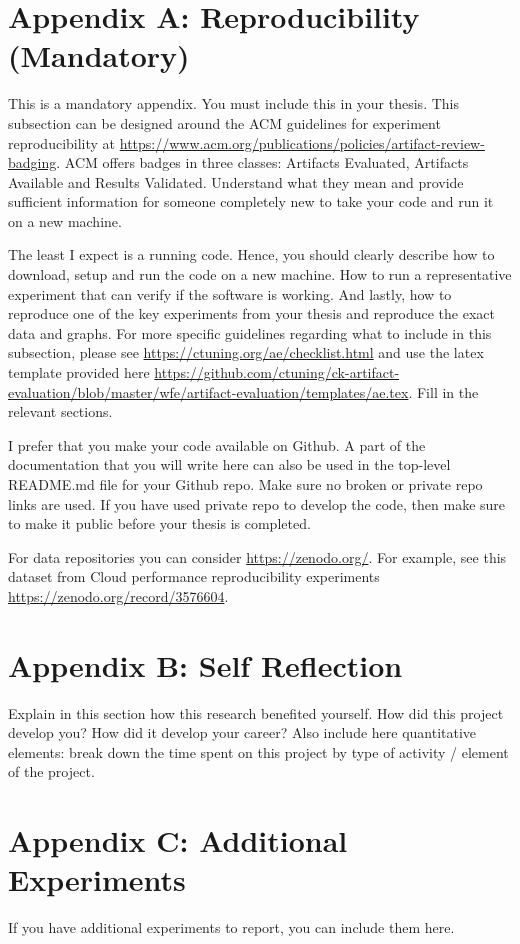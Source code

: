 \section*{Appendix A: Reproducibility (Mandatory)}
This is a mandatory appendix. You must include this in your thesis. This subsection can be designed around the ACM guidelines for experiment reproducibility at \url{https://www.acm.org/publications/policies/artifact-review-badging}. ACM offers badges in three classes: Artifacts Evaluated, Artifacts Available and Results Validated. Understand what they mean and provide sufficient information for someone completely new to take your code and run it on a new machine.  

The least I expect is a running code. Hence, you should clearly describe how to download, setup and run the code on a new machine. How to run a representative experiment that can verify if the software is working. And lastly, how to reproduce one of the key experiments from your thesis and reproduce the exact data and graphs. For more specific guidelines regarding what to include in this subsection, please see \url{https://ctuning.org/ae/checklist.html} and use the latex template provided here \url{https://github.com/ctuning/ck-artifact-evaluation/blob/master/wfe/artifact-evaluation/templates/ae.tex}. Fill in the relevant sections. 

I prefer that you make your code available on Github. A part of the documentation that you will write here can also be used in the top-level README.md file for your Github repo. Make sure no broken or private repo links are used. If you have used private repo to develop the code, then make sure to make it public before your thesis is completed. 

For data repositories you can consider \url{https://zenodo.org/}. For example, see this dataset from Cloud performance reproducibility experiments \url{https://zenodo.org/record/3576604}. 

\newpage 
\section*{Appendix B: Self Reflection}
Explain in this section how this research benefited yourself. How did this project develop you? How did it develop your career? Also include here quantitative elements: break down the time spent on this project by type of activity / element of the project.

\newpage 
\section*{Appendix C: Additional Experiments}
If you have additional experiments to report, you can include them here. 
